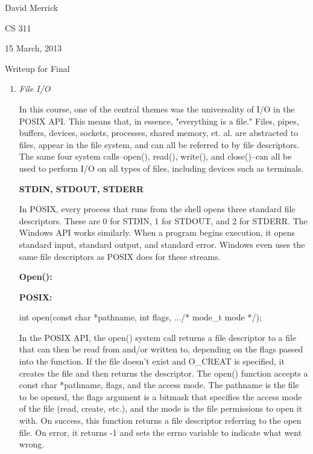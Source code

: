 \documentclass[letterpaper,10pt,titlepage]{article}
\newcommand{\ignore}[2]{\hspace{0in}#2} %
\newcommand{\tab}{\hspace*{2em}} %
\begin{document}
David Merrick

CS 311

15 March, 2013

\begin{center}
{\LARGE Writeup for Final}
\end{center}

\begin{enumerate} 
\item \emph{File I/O}

\tab In this course, one of the central themes was the universality of I/O in the POSIX API. This means that, in essence, "everything is a file." Files, pipes, buffers, devices, sockets, processes, shared memory, et. al. are abstracted to files, appear in the file system, and can all be referred to by file descriptors. The same four system calls--open(), read(), write(), and close()--can all be used to perform I/O on all types of files, including devices such as terminals. \newline

\textbf{STDIN, STDOUT, STDERR} \newline

\tab In POSIX, every process that runs from the shell opens three standard file descriptors. These are 0 for STDIN, 1 for STDOUT, and 2 for STDERR. The Windows API works similarly. When a program begins execution, it opens standard input, standard output, and standard error. Windows even uses the same file descriptors as POSIX does for these streams. \newline

\textbf{Open():}

\textbf{POSIX:}

int open(const char *pathname, int flags, .../* mode\_t mode */);\newline

\tab In the POSIX API, the open() system call returns a file descriptor to a file that can then be read from and/or written to, depending on the flags passed into the function. If the file doesn't exist and O\_CREAT is specified, it creates the file and then returns the descriptor. The open() function accepts a const char *pathname, flags, and the access mode. The pathname is the file to be opened, the flags argument is a bitmask that specifies the access mode of the file (read, create, etc.), and the mode is the file permissions to open it with\ignore{\[TLPI, pg. 72\]}. On success, this function returns a file descriptor referring to the open file. On error, it returns -1 and sets the errno variable to indicate what went wrong. \newline 


\end{enumerate}
\end{document}
